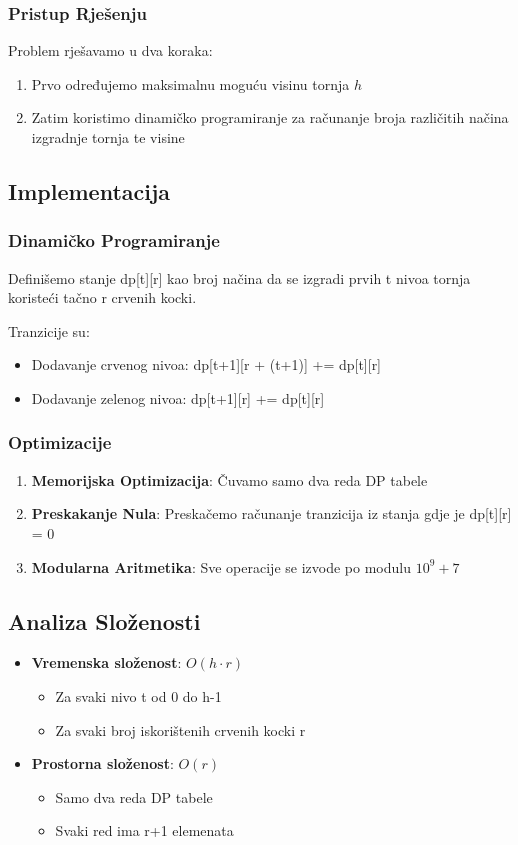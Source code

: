 \subsubsection{Pristup Rješenju}
Problem rješavamo u dva koraka:
\begin{enumerate}
    \item Prvo određujemo maksimalnu moguću visinu tornja $h$
    \item Zatim koristimo dinamičko programiranje za računanje broja različitih načina izgradnje tornja te visine
\end{enumerate}

\subsection{Implementacija}
\subsubsection{Dinamičko Programiranje}
Definišemo stanje dp[t][r] kao broj načina da se izgradi prvih t nivoa tornja koristeći tačno r crvenih kocki.

Tranzicije su:
\begin{itemize}
    \item Dodavanje crvenog nivoa: dp[t+1][r + (t+1)] += dp[t][r]
    \item Dodavanje zelenog nivoa: dp[t+1][r] += dp[t][r]
\end{itemize}

\subsubsection{Optimizacije}
\begin{enumerate}
    \item \textbf{Memorijska Optimizacija}: Čuvamo samo dva reda DP tabele
    \item \textbf{Preskakanje Nula}: Preskačemo računanje tranzicija iz stanja gdje je dp[t][r] = 0
    \item \textbf{Modularna Aritmetika}: Sve operacije se izvode po modulu $10^9 + 7$
\end{enumerate}

\subsection{Analiza Složenosti}
\begin{itemize}
    \item \textbf{Vremenska složenost}: $O(h \cdot r)$
        \begin{itemize}
            \item Za svaki nivo t od 0 do h-1
            \item Za svaki broj iskorištenih crvenih kocki r
        \end{itemize}
    \item \textbf{Prostorna složenost}: $O(r)$
        \begin{itemize}
            \item Samo dva reda DP tabele
            \item Svaki red ima r+1 elemenata
        \end{itemize}
\end{itemize}
